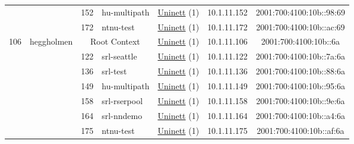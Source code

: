 \begin{small}
\begin{center}
\begin{longtable}{|c|c|c|c|c|c|c|c|}
  &  & \tiny{152} & \multicolumn{1}{|l|}{\tiny{hu-multipath}} & \multicolumn{2}{|c|}{\tiny{\href{https://www.uninett.no}{Uninett} (1)}} & \tiny{10.1.11.152} & \tiny{2001:700:4100:10b::98:69} \\* \cline{3-3}\cline{4-4}\cline{5-5}\cline{6-6}\cline{7-7}\cline{8-8}
  &  & \tiny{172} & \multicolumn{1}{|l|}{\tiny{ntnu-test}} & \multicolumn{2}{|c|}{\tiny{\href{https://www.uninett.no}{Uninett} (1)}} & \tiny{10.1.11.172} & \tiny{2001:700:4100:10b::ac:69} \\ \hline
 \multirow{7}{*}{\tiny{106}} & \multicolumn{1}{|l|}{\multirow{7}{*}{\tiny{heggholmen}}} & \multicolumn{2}{|c|}{\tiny{Root Context}} & \multicolumn{2}{|c|}{\tiny{\href{https://www.uninett.no}{Uninett} (1)}} & \tiny{10.1.11.106} & \tiny{2001:700:4100:10b::6a} \\* \cline{3-3}\cline{4-4}\cline{5-5}\cline{6-6}\cline{7-7}\cline{8-8}
  &  & \tiny{122} & \multicolumn{1}{|l|}{\tiny{srl-seattle}} & \multicolumn{2}{|c|}{\tiny{\href{https://www.uninett.no}{Uninett} (1)}} & \tiny{10.1.11.122} & \tiny{2001:700:4100:10b::7a:6a} \\* \cline{3-3}\cline{4-4}\cline{5-5}\cline{6-6}\cline{7-7}\cline{8-8}
  &  & \tiny{136} & \multicolumn{1}{|l|}{\tiny{srl-test}} & \multicolumn{2}{|c|}{\tiny{\href{https://www.uninett.no}{Uninett} (1)}} & \tiny{10.1.11.136} & \tiny{2001:700:4100:10b::88:6a} \\* \cline{3-3}\cline{4-4}\cline{5-5}\cline{6-6}\cline{7-7}\cline{8-8}
  &  & \tiny{149} & \multicolumn{1}{|l|}{\tiny{hu-multipath}} & \multicolumn{2}{|c|}{\tiny{\href{https://www.uninett.no}{Uninett} (1)}} & \tiny{10.1.11.149} & \tiny{2001:700:4100:10b::95:6a} \\* \cline{3-3}\cline{4-4}\cline{5-5}\cline{6-6}\cline{7-7}\cline{8-8}
  &  & \tiny{158} & \multicolumn{1}{|l|}{\tiny{srl-rserpool}} & \multicolumn{2}{|c|}{\tiny{\href{https://www.uninett.no}{Uninett} (1)}} & \tiny{10.1.11.158} & \tiny{2001:700:4100:10b::9e:6a} \\* \cline{3-3}\cline{4-4}\cline{5-5}\cline{6-6}\cline{7-7}\cline{8-8}
  &  & \tiny{164} & \multicolumn{1}{|l|}{\tiny{srl-nndemo}} & \multicolumn{2}{|c|}{\tiny{\href{https://www.uninett.no}{Uninett} (1)}} & \tiny{10.1.11.164} & \tiny{2001:700:4100:10b::a4:6a} \\* \cline{3-3}\cline{4-4}\cline{5-5}\cline{6-6}\cline{7-7}\cline{8-8}
  &  & \tiny{175} & \multicolumn{1}{|l|}{\tiny{ntnu-test}} & \multicolumn{2}{|c|}{\tiny{\href{https://www.uninett.no}{Uninett} (1)}} & \tiny{10.1.11.175} & \tiny{2001:700:4100:10b::af:6a} \\ \hline

\end{longtable}
\end{center}
\end{small}
